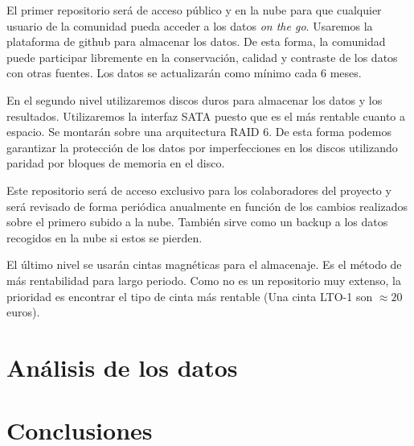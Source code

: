 \documentclass[12pt, spanish]{article}
\begin{document}
El primer repositorio será de acceso público y en la nube para que cualquier usuario de la comunidad pueda acceder a los datos \textit{on the go}. Usaremos la plataforma de github para almacenar los datos. De esta forma, la comunidad puede participar libremente en la conservación, calidad y contraste de los datos con otras fuentes. Los datos se actualizarán como mínimo cada 6 meses.

En el segundo nivel utilizaremos discos duros para almacenar los datos y los resultados. Utilizaremos la interfaz SATA puesto que es el más rentable cuanto a espacio. Se montarán sobre una arquitectura RAID 6. De esta forma podemos garantizar la protección de los datos por imperfecciones en los discos utilizando paridad por bloques de memoria en el disco.

Este repositorio será de acceso exclusivo para los colaboradores del proyecto y será revisado de forma periódica anualmente en función de los cambios realizados sobre el primero subido a la nube. También sirve como un backup a los datos recogidos en la nube si estos se pierden.

El último nivel se usarán cintas magnéticas para el almacenaje. Es el método de más rentabilidad para largo periodo. Como no es un repositorio muy extenso, la prioridad es encontrar el tipo de cinta más rentable (Una cinta LTO-1 son $\approx 20$ euros).

\section{Análisis de los datos}



\section{Conclusiones}

\newpage
\end{document}
